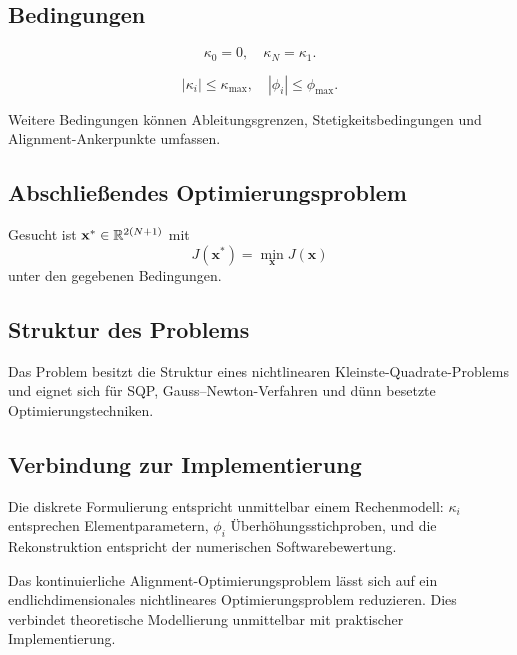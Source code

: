 \subsection{Bedingungen}
\begin{definition}[Gleichheitsbedingungen]
\[\kappa_0=0,\quad\kappa_N=\kappa_1.\]
\end{definition}
\begin{definition}[Ungleichheitsbedingungen]
\[|\kappa_i|\leq\kappa_{\max},\quad|\phi_i|\leq\phi_{\max}.\]
\end{definition}
Weitere Bedingungen können Ableitungsgrenzen, Stetigkeitsbedingungen und
Alignment-Ankerpunkte umfassen.

\subsection{Abschließendes Optimierungsproblem}
\begin{definition}
Gesucht ist \(\mathbf x^\ast\in\mathbb{R}^{2(N+1)}\) mit
\[
J(\mathbf x^\ast)=\min_{\mathbf x}J(\mathbf x)
\]
unter den gegebenen Bedingungen.
\end{definition}

\subsection{Struktur des Problems}
Das Problem besitzt die Struktur eines nichtlinearen
Kleinste-Quadrate-Problems und eignet sich für SQP, Gauss--Newton-Verfahren und
dünn besetzte Optimierungstechniken.

\subsection{Verbindung zur Implementierung}
Die diskrete Formulierung entspricht unmittelbar einem Rechenmodell:
\(\kappa_i\) entsprechen Elementparametern, \(\phi_i\) Überhöhungsstichproben,
und die Rekonstruktion entspricht der numerischen Softwarebewertung.

\begin{summary}
Das kontinuierliche Alignment-Optimierungsproblem lässt sich auf ein
endlichdimensionales nichtlineares Optimierungsproblem reduzieren. Dies
verbindet theoretische Modellierung unmittelbar mit praktischer Implementierung.
\end{summary}
